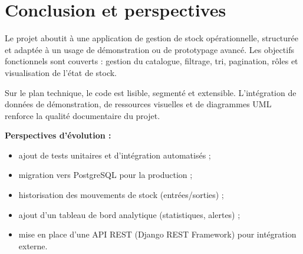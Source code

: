 \documentclass[11pt,a4paper]{article}
\begin{document}
\section{Conclusion et perspectives}
Le projet aboutit \`a une application de gestion de stock op\'erationnelle, structur\'ee et adapt\'ee \`a un usage de d\'emonstration ou de prototypage avanc\'e. Les objectifs fonctionnels sont couverts : gestion du catalogue, filtrage, tri, pagination, r\^oles et visualisation de l'\'etat de stock.

Sur le plan technique, le code est lisible, segment\'e et extensible. L'int\'egration de donn\'ees de d\'emonstration, de ressources visuelles et de diagrammes UML renforce la qualit\'e documentaire du projet.

\textbf{Perspectives d'\'evolution :}
\begin{itemize}[leftmargin=1.2cm]
  \item ajout de tests unitaires et d'int\'egration automatis\'es ;
  \item migration vers PostgreSQL pour la production ;
  \item historisation des mouvements de stock (entr\'ees/sorties) ;
  \item ajout d'un tableau de bord analytique (statistiques, alertes) ;
  \item mise en place d'une API REST (Django REST Framework) pour int\'egration externe.
\end{itemize}
\end{document}

